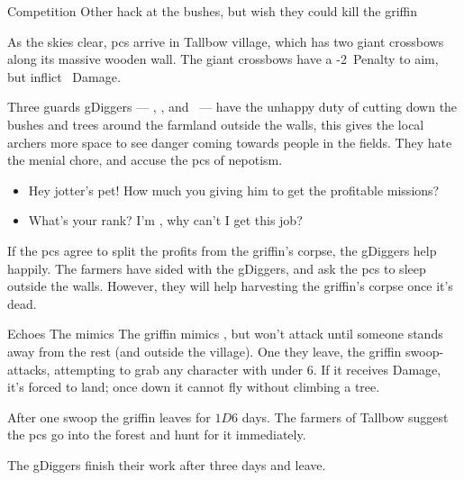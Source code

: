 \documentclass[10pt,twoside]{book}
\begin{document}
{Competition}%
{Other  hack at the bushes, but wish they could kill the \gls{griffin}}%

As the skies clear, \glspl{pc} arrive in Tallbow \gls{village}, which has two giant \glspl{crossbow} along its massive wooden wall.
The giant \glspl{crossbow} have a -2~Penalty to aim, but inflict ~Damage.

Three \glspl{guard} \glspl{gDigger} --- \composeHumanName, \composeHumanName, and \composeHumanName\ --- have the unhappy duty of cutting down the bushes and trees around the farmland outside the walls, this gives the local archers more space to see danger coming towards people in the fields.
They hate the menial chore, and accuse the \glspl{pc} of nepotism.

\begin{itemize}\it
  \item
  Hey \gls{jotter}'s pet!
  How much you giving him to get the profitable missions?
  \item
  What's your rank?
  I'm , why can't I get this job?
\end{itemize}

If the \glspl{pc} agree to split the profits from the \gls{griffin}'s corpse, the \glspl{gDigger} help happily.
The farmers have sided with the \glspl{gDigger}, and ask the \glspl{pc} to sleep outside the walls.
However, they will help \gls{harvesting} the \gls{griffin}'s corpse once it's dead.

\begin{figure}[ht]
\end{figure}%

{Echoes}%
{The  mimics }%
The \gls{griffin} mimics , but won't attack until someone stands away from the rest (and outside the \gls{village}).
One they leave, the \gls{griffin} swoop-attacks, attempting to grab any character with  under 6.
If it receives Damage, it's forced to land; once down it cannot fly without climbing a tree.

After one swoop the \gls{griffin} leaves for $1D6$ days.
The farmers of Tallbow suggest the \glspl{pc} go into the forest and hunt for it immediately.

The \glspl{gDigger} finish their work after three days and leave.
\end{document}
